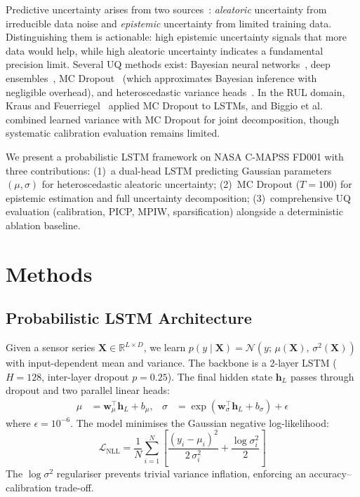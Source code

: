 \documentclass[runningheads]{llncs}
\begin{document}
Predictive uncertainty arises from two sources~\cite{kiureghian2009aleatory}: \emph{aleatoric} uncertainty from irreducible data noise and \emph{epistemic} uncertainty from limited training data.
Distinguishing them is actionable: high epistemic uncertainty signals that more data would help, while high aleatoric uncertainty indicates a fundamental precision limit.
Several UQ methods exist: Bayesian neural networks~\cite{blundell2015weight}, deep ensembles~\cite{lakshminarayanan2017simple}, MC Dropout~\cite{gal2016dropout} (which approximates Bayesian inference with negligible overhead), and heteroscedastic variance heads~\cite{nix1994estimating}.
In the RUL domain, Kraus and Feuerriegel~\cite{kraus2019forecasting} applied MC Dropout to LSTMs, and Biggio et al.~\cite{biggio2021prognostics} combined learned variance with MC Dropout for joint decomposition, though systematic calibration evaluation remains limited.

We present a probabilistic LSTM framework on NASA C-MAPSS FD001 with three contributions:
(1)~a dual-head LSTM predicting Gaussian parameters $(\mu, \sigma)$ for heteroscedastic aleatoric uncertainty;
(2)~MC Dropout ($T{=}100$) for epistemic estimation and full uncertainty decomposition;
(3)~comprehensive UQ evaluation (calibration, PICP, MPIW, sparsification) alongside a deterministic ablation baseline.

\section{Methods}
\label{sec:methods}

\subsection{Probabilistic LSTM Architecture}
Given a sensor series $\mathbf{X} \in \mathbb{R}^{L \times D}$, we learn $p(y \mid \mathbf{X}) = \mathcal{N}(y;\, \mu(\mathbf{X}),\, \sigma^2(\mathbf{X}))$ with input-dependent mean and variance.
The backbone is a 2-layer LSTM ($H{=}128$, inter-layer dropout $p{=}0.25$).
The final hidden state $\mathbf{h}_L$ passes through dropout and two parallel linear heads:
\begin{align}
    \mu &= \mathbf{w}_\mu^\top \mathbf{h}_L + b_\mu, &
    \sigma &= \exp(\mathbf{w}_\sigma^\top \mathbf{h}_L + b_\sigma) + \epsilon
\end{align}
where $\epsilon{=}10^{-6}$.
The model minimises the Gaussian negative log-likelihood:
\begin{equation}
    \mathcal{L}_{\text{NLL}} = \frac{1}{N} \sum_{i=1}^{N} \left[ \frac{(y_i - \mu_i)^2}{2\,\sigma_i^2} + \frac{\log \sigma_i^2}{2} \right]
\label{eq:nll}
\end{equation}
The $\log\sigma^2$ regulariser prevents trivial variance inflation, enforcing an accuracy--calibration trade-off.
\end{document}
